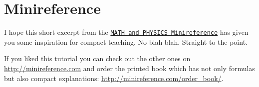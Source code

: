 \documentclass[letterpaper,9pt,journal]{IEEEtran}
\begin{document}
\appendix 
\section{Minireference}


I hope this short excerpt from the \href{http://minireference.com/contents}{\texttt{MATH and PHYSICS Minireference}}
has given you some inspiration for compact teaching. No blah blah. Straight to the point.

If you liked this tutorial you can check out the other ones on \url{http://minireference.com}
and order the printed book which has not only formulas but also compact explanations:
\url{http://minireference.com/order_book/}.
\end{document}
